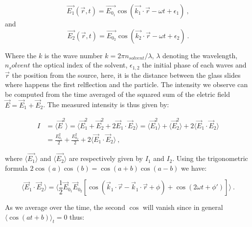 \begin{equation}
	\vec{E_1}(\vec{r}, t) = \vec{E_{0_1}} \cos(\vec{k_1} \cdot \vec{r} - \omega t + \epsilon_1) ~,
\end{equation}
and
\begin{equation}
	\vec{E_2}(\vec{r}, t) = \vec{E_{0_2}} \cos (\vec{k_2} \cdot \vec{r} - \omega t + \epsilon_2) ~.
\end{equation}



Where the $k$ is the wave number $k=2\pi n_{solvent}/\lambda$, $\lambda$ denoting the wavelength, $n_solvent$ the optical index of the solvent, $\epsilon_{1,2}$ the initial phase of each waves and $\vec{r}$ the position from the source, here, it is the distance between the glass slides where happens the first relflection and the particle. The intensity we observe can be computed from the time averaged of the squared sum of the eletric field $\vec{E} = \vec{E}_1 + \vec{E}_2$. The measured intensity is thus given by:

\begin{equation}
	\begin{aligned}
		I & = \langle \vec{E}^2 \rangle = \langle \vec{E}_1^2 + \vec{E}_2^2 + 2\vec{E}_1 \cdot \vec{E}_2 \rangle 
		= \langle \vec{E}_1^2 \rangle + \langle \vec{E}_2^2 \rangle  + 2 \langle \vec{E}_1 \cdot \vec{E}_2 \rangle \\
		& = \frac{{E_{0_1}^2}}{2} + \frac{{E_{0_2}^2}}{2} +  2 \langle \vec{E}_1 \cdot \vec{E}_2 \rangle ~,
	\end{aligned}
\end{equation} 

where $ \langle \vec{E_1} \rangle $ and  $\langle \vec{E_2} \rangle$ are respectively given by $I_1$ and $I_2$. Using the trigonometric formula $2 \cos (a)\cos (b) = \cos (a+b) \cos (a-b) $ we have:

\begin{equation}
	\langle  
	\vec{E}_1 \cdot \vec{E}_2 \rangle = 
	\langle
	\frac{1}{2} \vec{E}_{0_1}  \vec{E}_{0_2} 
	\left[
		\cos 
		\left(
			\vec{k}_1 \cdot \vec{r} - \vec{k}_1 \cdot \vec{r} + \phi	
		\right)	
		+ 
		\cos
		\left(
			2\omega t + \phi'
		\right)
	\right]
	\rangle~.
\end{equation}

As we average over the time, the second $\cos$ will vanish since in general $\langle \cos(at + b) \rangle_ t = 0$ thus:

